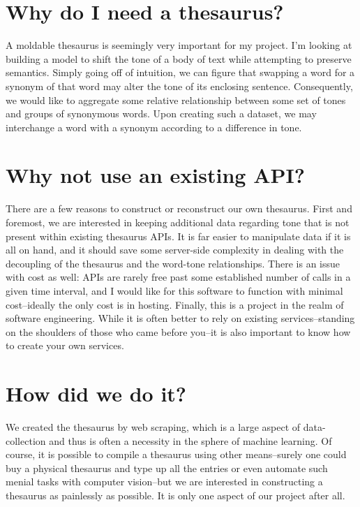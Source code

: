 \documentclass[11pt, twoside, reqno]{book}
\begin{document}
\section{Why do I need a thesaurus?}

A moldable thesaurus is seemingly very important for my project. I'm looking at building a model to shift the tone of a body of text while attempting to preserve semantics. Simply going off of intuition, we can figure that swapping a word for a synonym of that word may alter the tone of its enclosing sentence. Consequently, we would like to aggregate some relative relationship between some set of tones and groups of synonymous words. Upon creating such a dataset, we may interchange a word with a synonym according to a difference in tone.

\section{Why not use an existing API?}

There are a few reasons to construct or reconstruct our own thesaurus. First and foremost, we are interested in keeping additional data regarding tone that is not present within existing thesaurus APIs. It is far easier to manipulate data if it is all on hand, and it should save some server-side complexity in dealing with the decoupling of the thesaurus and the word-tone relationships. There is an issue with cost as well: APIs are rarely free past some established number of calls in a given time interval, and I would like for this software to function with minimal cost--ideally the only cost is in hosting. Finally, this is a project in the realm of software engineering. While it is often better to rely on existing services--standing on the shoulders of those who came before you--it is also important to know how to create your own services.

\section{How did we do it?}

We created the thesaurus by web scraping, which is a large aspect of data-collection and thus is often a necessity in the sphere of machine learning. Of course, it is possible to compile a thesaurus using other means--surely one could buy a physical thesaurus and type up all the entries or even automate such menial tasks with computer vision--but we are interested in constructing a thesaurus as painlessly as possible. It is only one aspect of our project after all.
\end{document}
